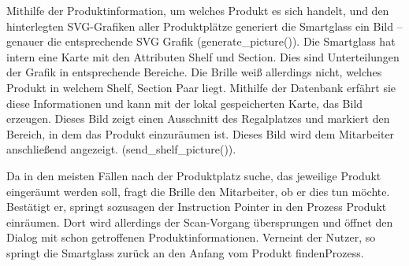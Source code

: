 Mithilfe der Produktinformation, um welches Produkt es sich handelt, und den hinterlegten SVG-Grafiken aller Produktplätze generiert die Smartglass ein Bild – genauer die entsprechende SVG Grafik (generate\_picture()). Die Smartglass hat intern eine Karte mit den Attributen Shelf und Section. Dies sind Unterteilungen der Grafik in entsprechende Bereiche. Die Brille weiß allerdings nicht, welches Produkt in welchem Shelf, Section Paar liegt. Mithilfe der Datenbank erfährt sie diese Informationen und kann mit der lokal gespeicherten Karte, das Bild erzeugen. Dieses Bild zeigt einen Ausschnitt des Regalplatzes und markiert den Bereich, in dem das Produkt einzuräumen ist. Dieses Bild wird dem Mitarbeiter anschließend angezeigt. (send\_shelf\_picture()).

Da in den meisten Fällen nach der Produktplatz suche, das jeweilige Produkt eingeräumt werden soll, fragt die Brille den Mitarbeiter, ob er dies tun möchte.
Bestätigt er, springt sozusagen der Instruction Pointer in den Prozess \glqq Produkt einräumen\grqq . Dort wird allerdings der Scan-Vorgang übersprungen und öffnet den Dialog mit schon getroffenen Produktinformationen. 
Verneint der Nutzer, so springt die Smartglass zurück an den Anfang vom \glqq Produkt finden\grqq Prozess. 

